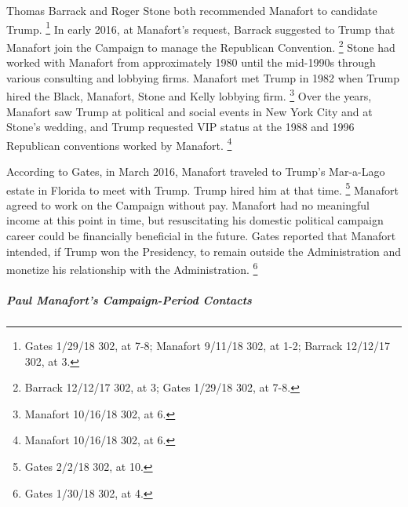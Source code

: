 Thomas Barrack and Roger Stone both recommended Manafort to candidate Trump.%
\footnote{Gates 1/29/18 302, at 7-8;
Manafort 9/11/18 302, at 1-2;
Barrack 12/12/17 302, at 3.}
In early 2016, at Manafort's request, Barrack suggested to Trump that Manafort join the Campaign to manage the Republican Convention.%
\footnote{Barrack 12/12/17 302, at 3;
Gates 1/29/18 302, at 7-8.}
Stone had worked with Manafort from approximately 1980 until the mid-1990s through various consulting and lobbying firms.
Manafort met Trump in 1982 when Trump hired the Black, Manafort, Stone and Kelly lobbying firm.%
\footnote{Manafort 10/16/18 302, at 6.}
Over the years, Manafort saw Trump at political and social events in New York City and at Stone's wedding, and Trump requested VIP status at the 1988 and 1996 Republican conventions worked by Manafort.%
\footnote{Manafort 10/16/18 302, at 6.}

According to Gates, in March 2016, Manafort traveled to Trump's Mar-a-Lago estate in Florida to meet with Trump.
Trump hired him at that time.%
\footnote{Gates 2/2/18 302, at 10.}
Manafort agreed to work on the Campaign without pay.
Manafort had no meaningful income at this point in time, but resuscitating his domestic political campaign career could be financially beneficial in the future.
Gates reported that Manafort intended, if Trump won the Presidency, to remain outside the Administration and monetize his relationship with the Administration.%
\footnote{Gates 1/30/18 302, at 4.}

\subparagraph{Paul Manafort's Campaign-Period Contacts}

